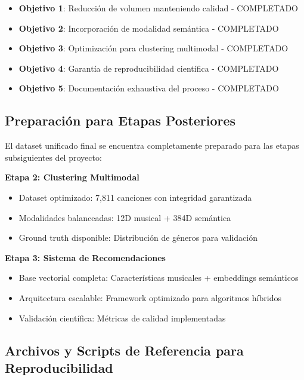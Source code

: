 \documentclass[12pt,a4paper]{article}
\begin{document}
\begin{itemize}[leftmargin=*]
    \item[\checkmark] \textbf{Objetivo 1}: Reducción de volumen manteniendo calidad - COMPLETADO
    \item[\checkmark] \textbf{Objetivo 2}: Incorporación de modalidad semántica - COMPLETADO  
    \item[\checkmark] \textbf{Objetivo 3}: Optimización para clustering multimodal - COMPLETADO
    \item[\checkmark] \textbf{Objetivo 4}: Garantía de reproducibilidad científica - COMPLETADO
    \item[\checkmark] \textbf{Objetivo 5}: Documentación exhaustiva del proceso - COMPLETADO
\end{itemize}

\subsection{Preparación para Etapas Posteriores}

El dataset unificado final se encuentra completamente preparado para las etapas subsiguientes del proyecto:

\textbf{Etapa 2: Clustering Multimodal}
\begin{itemize}[leftmargin=*]
    \item Dataset optimizado: 7,811 canciones con integridad garantizada
    \item Modalidades balanceadas: 12D musical + 384D semántica
    \item Ground truth disponible: Distribución de géneros para validación
\end{itemize}

\textbf{Etapa 3: Sistema de Recomendaciones}
\begin{itemize}[leftmargin=*]
    \item Base vectorial completa: Características musicales + embeddings semánticos
    \item Arquitectura escalable: Framework optimizado para algoritmos híbridos
    \item Validación científica: Métricas de calidad implementadas
\end{itemize}

\subsection{Archivos y Scripts de Referencia para Reproducibilidad}
\end{document}
